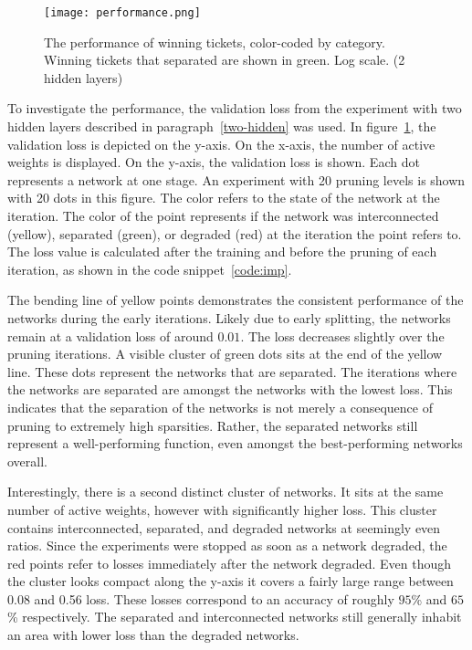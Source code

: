 \begin{figure}[ht]
    \centering
    \texttt{[image: performance.png]}
    \caption[Performance of winning tickets]{
        The performance of winning tickets, color-coded by category.
        Winning tickets that separated are shown in green.
        Log scale. (2 hidden layers)
    }\label{fig:performance}
\end{figure}

To investigate the performance, the validation loss from the experiment with two hidden layers described in paragraph~\ref{two-hidden} was used.
In figure~\ref{fig:performance}, the validation loss is depicted on the y-axis.
On the x-axis, the number of active weights is displayed.
On the y-axis, the validation loss is shown.
Each dot represents a network at one stage.
An experiment with 20 pruning levels is shown with 20 dots in this figure.
The color refers to the state of the network at the iteration.
The color of the point represents if the network was interconnected (yellow), separated (green), or degraded (red) at the iteration the point refers to.
The loss value is calculated after the training and before the pruning of each iteration, as shown in the code snippet~\ref{code:imp}.

The bending line of yellow points demonstrates the consistent performance of the networks during the early iterations.
Likely due to early splitting, the networks remain at a validation loss of around $0.01$.
The loss decreases slightly over the pruning iterations.
A visible cluster of green dots sits at the end of the yellow line.
These dots represent the networks that are separated.
The iterations where the networks are separated are amongst the networks with the lowest loss.
This indicates that the separation of the networks is not merely a consequence of pruning to extremely high sparsities.
Rather, the separated networks still represent a well-performing function, even amongst the best-performing networks overall.

Interestingly, there is a second distinct cluster of networks.
It sits at the same number of active weights, however with significantly higher loss.
This cluster contains interconnected, separated, and degraded networks at seemingly even ratios.
Since the experiments were stopped as soon as a network degraded, the red points refer to losses immediately after the network degraded.
Even though the cluster looks compact along the y-axis it covers a fairly large range between 0.08 and 0.56 loss. These losses correspond to an accuracy of roughly $95$\% and $65$\% respectively.
The separated and interconnected networks still generally inhabit an area with lower loss than the degraded networks.

